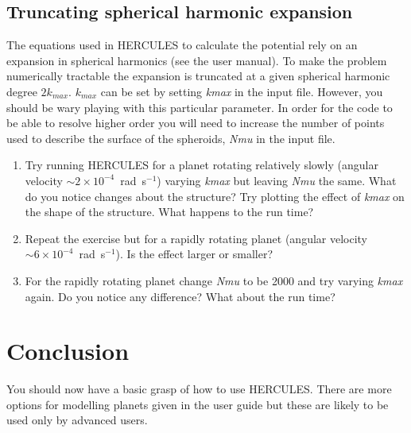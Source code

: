 \documentclass[11pt, oneside]{article}   	%
\begin{document}
\subsection{Truncating spherical harmonic expansion}

The equations used in HERCULES to calculate the potential rely on an expansion in spherical harmonics (see the user manual). To make the problem numerically tractable the expansion is truncated at a given spherical harmonic degree $2k_{max}$. $k_{max}$ can be set by setting {\it kmax} in the input file. However, you should be wary playing with this particular parameter. In order for the code to be able to resolve higher order you will need to increase the number of points used to describe the surface of the spheroids, {\it Nmu} in the input file. 

\begin{enumerate}

\item Try running HERCULES for a planet rotating relatively slowly (angular velocity $\sim 2\times10^{-4}$~rad~s$^{-1}$) varying {\it kmax} but leaving {\it Nmu} the same. What do you notice changes about the structure? Try plotting the effect of {\it kmax} on the shape of the structure. What happens to the run time?

\item Repeat the exercise but for a rapidly rotating planet (angular velocity $\sim 6\times10^{-4}$~rad~s$^{-1}$). Is the effect larger or smaller? 

\item For the rapidly rotating planet change {\it Nmu} to be 2000 and try varying {\it kmax} again. Do you notice any difference? What about the run time?

\end{enumerate}

\section{Conclusion}

You should now have a basic grasp of how to use HERCULES. There are more options for modelling planets given in the user guide but these are likely to be used only by advanced users. 




\end{document}
